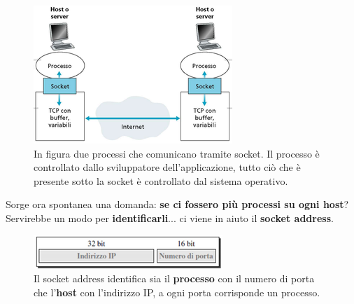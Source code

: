 \documentclass[11pt,a4paper,oneside]{book}
\theoremstyle{definition}
\begin{document}
\begin{figure}[!h]
	\includegraphics[scale=0.5]{Immagini/Socket.png}
	\centering
	\caption{In figura due processi che comunicano tramite socket. Il processo è controllato dallo sviluppatore dell'applicazione, tutto ciò che è presente sotto la socket è controllato dal sistema operativo.}
\end{figure}
Sorge ora spontanea una domanda: \textbf{se ci fossero più processi su ogni host}?\newline
Servirebbe un modo per \textbf{identificarli}... ci viene in aiuto il \textbf{socket address}.
\begin{figure}[!h]
	\includegraphics[scale=0.5]{Immagini/Socket_addr.png}
	\centering
	\caption{Il socket address identifica sia il \textbf{processo} con il numero di porta che l'\textbf{host} con l'indirizzo IP, a ogni porta corrisponde un processo.}
\end{figure}

\pagebreak
\end{document}

